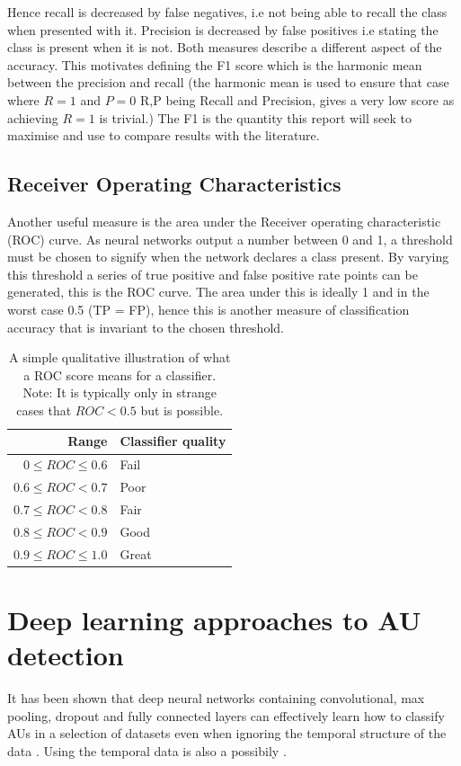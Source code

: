     Hence recall is decreased by false negatives, i.e not being able to recall the class
    when presented with it. Precision is decreased by false positives i.e stating the class
    is present when it is not. Both measures describe a different aspect of the accuracy. This
    motivates defining the F1 score which is the harmonic mean between the precision and recall
    (the harmonic mean is used to ensure that case where $R=1$ and $P=0$ R,P being Recall and Precision, gives
    a very low score  as achieving $R=1$ is trivial.) The F1 is the quantity this report will seek to maximise and use to compare
    results with the literature.
  \subsection{Receiver Operating Characteristics}
    Another useful measure is the area under the Receiver operating characteristic (ROC) curve.
    As neural networks output a number between 0 and 1, a threshold must be chosen to signify
    when the network declares a class present. By varying this threshold a series of true positive and false positive rate points
    can be generated, this is the ROC curve. The area under this is ideally 1 and in the worst case 0.5 (TP = FP), hence this is
    another measure of classification accuracy that is invariant to the chosen threshold.

    \begin{table}[]
      \centering \caption{A simple qualitative illustration of what a ROC score means for a classifier.
      Note: It is typically only in strange cases that $ROC< 0.5$ but is possible.} \label{my-lasfasffffabel}
      \begin{tabular}{rl}
        \hline
        Range & Classifier quality \\ \hline
        $0 \leq ROC \leq 0.6$   & Fail               \\
        $0.6 \leq ROC    < 0.7$   & Poor               \\
        $0.7 \leq ROC    < 0.8$   & Fair               \\
        $0.8 \leq ROC    < 0.9$   & Good               \\
        $0.9 \leq ROC \leq 1.0$   & Great              \\ \hline
      \end{tabular}
  \end{table}
  \section{Deep learning approaches to AU detection}
    It has been shown that deep neural networks containing convolutional, max pooling,
    dropout and fully connected layers can effectively learn how to classify AUs in
    a selection of datasets even when ignoring the temporal structure of the data \cite{Gudi2015,Ghosh2015,Khorrami2015}.
    Using the temporal data is also a possibily \cite{emonet,Jaiswal2016}.
